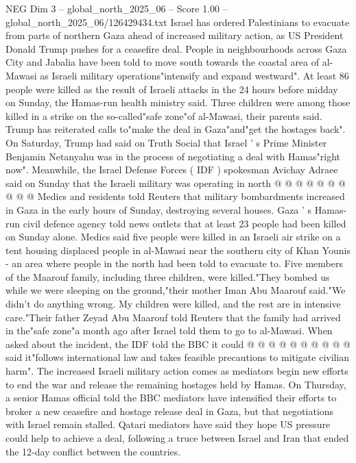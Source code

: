 \begin{textsample}{NEG Dim 3 – global\_north\_2025\_06 – Score 1.00 – global\_north\_2025\_06/126429434.txt}  \label{ex:f3_neg_367}
Israel has ordered Palestinians to evacuate from parts of northern Gaza ahead of increased military action, as US President Donald Trump pushes for a ceasefire deal.
People in neighbourhoods across Gaza City and Jabalia have been told to move south towards the coastal area of al-Mawasi as Israeli military operations"intensify and expand westward".
At least 86 people were killed as the result of Israeli attacks in the 24 hours before midday on Sunday, the Hamas-run health ministry said.
Three children were among those killed in a strike on the so-called"safe zone"of al-Mawasi, their parents said.
Trump has reiterated calls to"make the deal in Gaza"and"get the hostages back".
On Saturday, Trump had said on Truth Social that Israel ' s Prime Minister Benjamin Netanyahu was in the process of negotiating a deal with Hamas"right now".
Meanwhile, the Israel Defense Forces ( IDF ) spokesman Avichay Adraee said on Sunday that the Israeli military was operating in north @ @ @ @ @ @ @ @ @ @ Medics and residents told Reuters that military bombardments increased in Gaza in the early hours of Sunday, destroying several houses.
Gaza ' s Hamas-run civil defence agency told news outlets that at least 23 people had been killed on Sunday alone.
Medics said five people were killed in an Israeli air strike on a tent housing displaced people in al-Mawasi near the southern city of Khan Younis - an area where people in the north had been told to evacuate to.
Five members of the Maarouf family, including three children, were killed."They bombed us while we were sleeping on the ground,"their mother Iman Abu Maarouf said."We didn't do anything wrong.
My children were killed, and the rest are in intensive care."Their father Zeyad Abu Maarouf told Reuters that the family had arrived in the"safe zone"a month ago after Israel told them to go to al-Mawasi.
When asked about the incident, the IDF told the BBC it could @ @ @ @ @ @ @ @ @ @ said it"follows international law and takes feasible precautions to mitigate civilian harm".
The increased Israeli military action comes as mediators begin new efforts to end the war and release the remaining hostages held by Hamas.
On Thursday, a senior Hamas official told the BBC mediators have intensified their efforts to broker a new ceasefire and hostage release deal in Gaza, but that negotiations with Israel remain stalled.
Qatari mediators have said they hope US pressure could help to achieve a deal, following a truce between Israel and Iran that ended the 12-day conflict between the countries.

\end{textsample}
